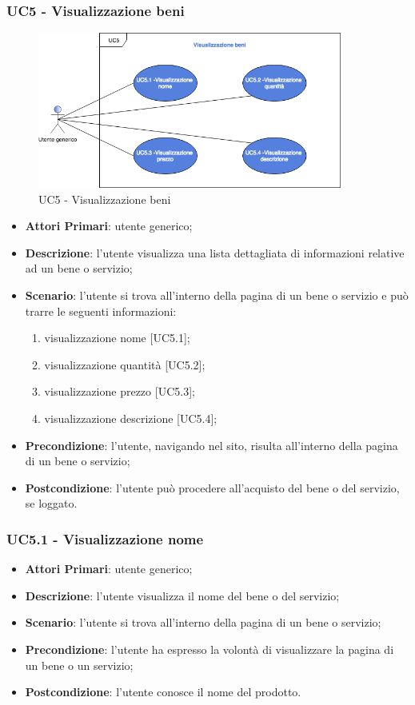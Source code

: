  \subsubsection{UC5 - Visualizzazione beni}
 \begin{figure}[h]
 	\includegraphics[width=10cm]{res/images/UC5VisualizzazioneBeni.png}
 	\centering
 	\caption{UC5 - Visualizzazione beni}
 \end{figure}
 \begin{itemize}
 	\item \textbf{Attori Primari}: utente generico;
 	\item \textbf{Descrizione}: l'utente visualizza una lista dettagliata di informazioni relative ad un bene o servizio;
 	\item \textbf{Scenario}: l'utente si trova all'interno della pagina di un bene o servizio e può trarre le seguenti informazioni:
 		\begin{enumerate}[label=\alph*.]
 		\item visualizzazione nome [UC5.1];
 		\item visualizzazione quantità [UC5.2];
 		\item visualizzazione prezzo [UC5.3];
 		\item visualizzazione descrizione [UC5.4];
 	\end{enumerate}
 	\item \textbf{Precondizione}: l'utente, navigando nel sito, risulta all'interno della pagina di un bene o servizio;
 	\item \textbf{Postcondizione}: l'utente può procedere all'acquisto del bene o del servizio, se loggato.
 \end{itemize}
 \subsubsection{UC5.1 - Visualizzazione nome}
\begin{itemize}
	\item \textbf{Attori Primari}: utente generico;
	\item \textbf{Descrizione}: l'utente visualizza il nome del bene o del servizio;
	\item \textbf{Scenario}: l'utente si trova all'interno della pagina di un bene o servizio;
	\item \textbf{Precondizione}: l'utente ha espresso la volontà di visualizzare la pagina di un bene o un servizio;
	\item \textbf{Postcondizione}: l'utente conosce il nome del prodotto.
\end{itemize}
